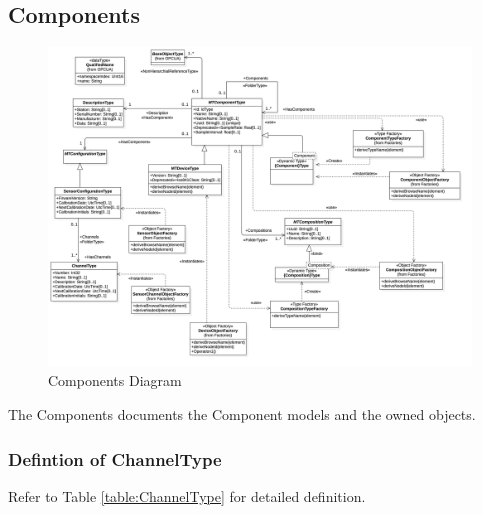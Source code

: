 \subsection{Components}

\begin{figure}
  \centering
    \includegraphics[width=1.0\textwidth]{diagrams/Components.png}
  \caption{Components Diagram}
  \label{fig:Components}
\end{figure}

\FloatBarrier


The Components documents the Component models and the owned objects.

\subsubsection{Defintion of ChannelType} \label{type:ChannelType}

\FloatBarrier



Refer to Table \ref{table:ChannelType} for detailed definition.

